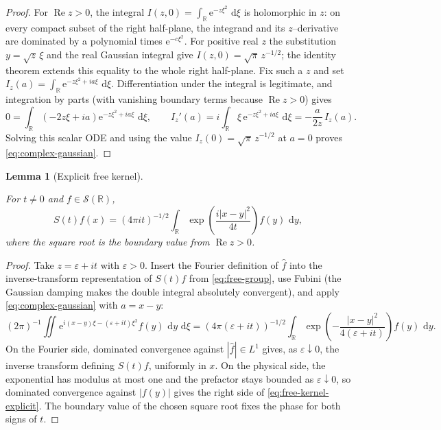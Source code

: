 \documentclass[11pt,oneside]{book}
\providecommand{\uses}[1]{}
\newtheorem{lemma}[theorem]{Lemma}
\theoremstyle{definition}
\theoremstyle{remark}
\newcommand{\R}{\mathbb R}
\newcommand{\Ssch}{\mathcal S}
\newcommand{\1}{\mathbf 1}
\newcommand{\Rea}{\operatorname{Re}}
\newcommand{\dd}{\,\mathrm d}
\newcommand{\e}{\mathrm e}
\newcommand{\eps}{\varepsilon}
\begin{document}
\begin{proof}
For $\Rea z>0$, the integral $I(z,0)=\int_\R\e^{-z\xi^2}\,\dd\xi$ is
holomorphic in $z$: on every compact subset of the right half-plane, the
integrand and its $z$--derivative are dominated by a polynomial times
$\e^{-c\xi^2}$.  For positive real $z$ the substitution $y=\sqrt z\,\xi$ and
the real Gaussian integral give $I(z,0)=\sqrt\pi\,z^{-1/2}$; the identity
theorem extends this equality to the whole right half-plane.  Fix such a $z$
and set $I_z(a)=\int_\R\e^{-z\xi^2+ia\xi}\,\dd\xi$.  Differentiation under
the integral is legitimate, and integration by parts (with vanishing
boundary terms because $\Rea z>0$) gives
\[
 0=\int_\R(-2z\xi+ia)\e^{-z\xi^2+ia\xi}\,\dd\xi,
 \qquad
 I_z'(a)=i\int_\R\xi\,\e^{-z\xi^2+ia\xi}\,\dd\xi
        =-\frac a{2z}\,I_z(a).
\]
Solving this scalar ODE and using the value $I_z(0)=\sqrt\pi\,z^{-1/2}$ at
$a=0$ proves \eqref{eq:complex-gaussian}.
\end{proof}

\begin{lemma}[Explicit free kernel]
\label{lem:free-kernel-explicit}
\uses{lem:complex-gaussian-kernel, def:propagator}
For $t\ne0$ and $f\in\Ssch(\R)$,
\begin{equation}
 S(t)f(x)=(4\pi it)^{-1/2}\int_\R
 \exp\!\left(\frac{i|x-y|^2}{4t}\right)f(y)\,\dd y,
 \label{eq:free-kernel-explicit}
\end{equation}
where the square root is the boundary value from $\Rea z>0$.
\end{lemma}

\begin{proof}
\uses{lem:complex-gaussian-kernel, def:propagator, lem:propagator-unitary}
Take $z=\eps+it$ with $\eps>0$.  Insert the Fourier definition of
$\widehat f$ into the inverse-transform representation of $S(t)f$ from
\eqref{eq:free-group}, use Fubini (the Gaussian damping makes the double
integral absolutely convergent), and apply \eqref{eq:complex-gaussian} with
$a=x-y$:
\[
 (2\pi)^{-1}\iint_{}
  \e^{i(x-y)\xi-(\eps+it)\xi^2}f(y)\,\dd y\,\dd\xi
 =(4\pi(\eps+it))^{-1/2}\int_\R
  \exp\!\left(-\frac{|x-y|^2}{4(\eps+it)}\right)f(y)\,\dd y.
\]
On the Fourier side, dominated convergence against $|\widehat f|\in L^1$
gives, as $\eps\downarrow0$, the inverse transform defining $S(t)f$,
uniformly in $x$.  On the physical side, the exponential has modulus at most
one and the prefactor stays bounded as $\eps\downarrow0$, so dominated
convergence against $|f(y)|$ gives the right side of
\eqref{eq:free-kernel-explicit}.  The boundary value of the chosen square
root fixes the phase for both signs of $t$.
\end{proof}
\end{document}
